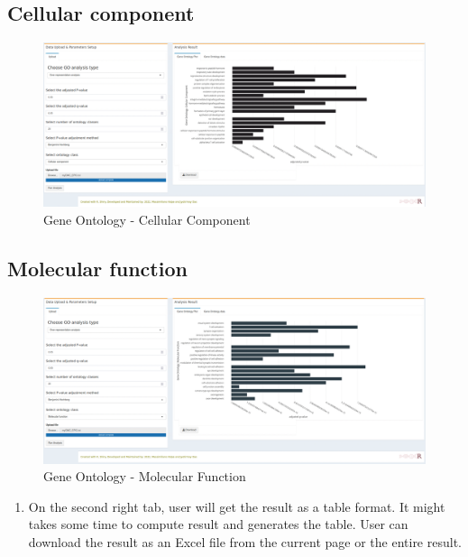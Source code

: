 \documentclass[
  a4paper,
  oneside,
  open=any]{scrreport}
\providecommand{\tightlist}{%
  \setlength{\itemsep}{0pt}\setlength{\parskip}{0pt}}\usepackage{longtable,booktabs,array}
\begin{document}
\hypertarget{cellular-component}{%
\subsection{Cellular component}\label{cellular-component}}

\begin{figure}[H]

{\centering \includegraphics{./_images/GO-CC.png}

}

\caption{Gene Ontology - Cellular Component}

\end{figure}

\hypertarget{molecular-function}{%
\subsection{Molecular function}\label{molecular-function}}

\begin{figure}[H]

{\centering \includegraphics{./_images/GO-MF.png}

}

\caption{Gene Ontology - Molecular Function}

\end{figure}

\begin{enumerate}
\def\labelenumi{\arabic{enumi}.}
\setcounter{enumi}{1}
\tightlist
\item
  On the second right tab, user will get the result as a table format.
  It might takes some time to compute result and generates the table.
  User can download the result as an Excel file from the current page or
  the entire result.\\
\end{enumerate}
\end{document}
